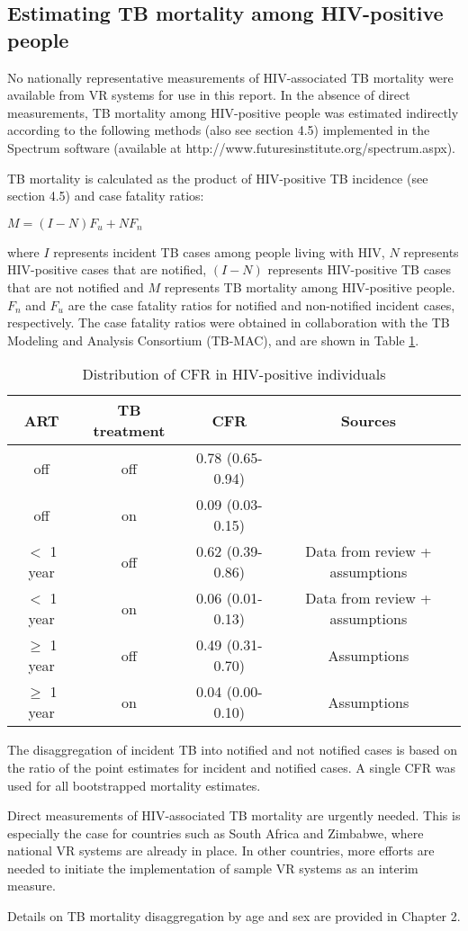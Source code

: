 \subsection{Estimating TB mortality among HIV-positive people}

No nationally representative measurements of HIV-associated TB mortality were available from VR systems for use in this report. In the absence of direct measurements, TB mortality among HIV-positive people was estimated indirectly according to the following methods (also see section 4.5) implemented in the Spectrum software (available at http://www.futuresinstitute.org/spectrum.aspx).

TB mortality is calculated as the product of HIV-positive TB incidence (see section 4.5) and case fatality ratios:

$M = (I-N)F_u + NF_n$ 									

where $I$ represents incident TB cases among people living with HIV, $N$ represents HIV-positive cases that are notified, $(I-N)$ represents HIV-positive TB cases that are not notified and $M$ represents TB mortality among HIV-positive people. $F_n$ and $F_u$ are the case fatality ratios for notified and non-notified incident cases, respectively. The case fatality ratios were obtained in collaboration with the TB Modeling and Analysis Consortium (TB-MAC), and are shown in Table \ref{tab:hivcfr}.

\begin{table}[ht]
\label{tab:hivcfr}
    \begin{tabular}{ c c c c }
    \hline
        ART  & TB treatment & CFR & Sources \\ 
        \hline
        off            & off  & 0.78 (0.65-0.94) &  \cite{12742798} \\ 
        off            & on   & 0.09 (0.03-0.15) & \cite{21738585} \cite{11216921}\\ 
        $<$ 1 year     & off  & 0.62 (0.39-0.86) & Data from review + assumptions \\ 
        $<$ 1 year     & on   & 0.06 (0.01-0.13) & Data from review + assumptions \\ 
        $\geq$ 1 year  & off  & 0.49 (0.31-0.70) & Assumptions \\ 
        $\geq$ 1 year  & on   & 0.04 (0.00-0.10) & Assumptions \\ 
        \hline
    \end{tabular} 
    \caption{Distribution of CFR in HIV-positive individuals}
\end{table}

The disaggregation of incident TB into notified and not notified cases is based on the ratio of the point estimates for incident and notified cases. A single CFR was used for all bootstrapped mortality estimates.

Direct measurements of HIV-associated TB mortality are urgently needed. This is especially the case for countries such as South Africa and Zimbabwe, where national VR systems are already in place. In other countries, more efforts are needed to initiate the implementation of sample VR systems as an interim measure.

Details on TB mortality disaggregation by age and sex are provided in Chapter 2.
